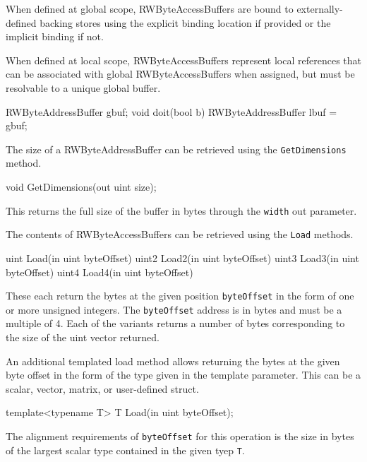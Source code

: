 When defined at global scope, RWByteAccessBuffers are bound to externally-defined backing stores
using the explicit binding location if provided or the implicit binding if not.

When defined at local scope, RWByteAccessBuffers represent local references
that can be associated with global RWByteAccessBuffers when assigned,
but must be resolvable to a unique global buffer.

\begin{HLSL}
  RWByteAddressBuffer gbuf;
  void doit(bool b) {
    RWByteAddressBuffer lbuf = gbuf;
  }
\end{HLSL}


The size of a RWByteAddressBuffer can be retrieved using the \texttt{GetDimensions} method.
\begin{HLSL}
void GetDimensions(out uint size);
\end{HLSL}

This returns the full size of the buffer in bytes through the \texttt{width} out parameter.


The contents of RWByteAccessBuffers can be retrieved using the \texttt{Load} methods.

\begin{HLSL}
 uint Load(in uint byteOffset)
 uint2 Load2(in uint byteOffset)
 uint3 Load3(in uint byteOffset)
 uint4 Load4(in uint byteOffset)
\end{HLSL}

These each return the bytes at the given position \texttt{byteOffset} in the form of one or more unsigned integers.
The \texttt{byteOffset} address is in bytes and must be a multiple of 4.
Each of the variants returns a number of bytes corresponding to the size of the uint vector returned.

An additional templated load method allows returning the bytes at the given byte offset in the form
of the type given in the template parameter. This can be a scalar, vector, matrix, or user-defined struct.

\begin{HLSL}
  template<typename T>
  T Load(in uint byteOffset);
\end{HLSL}

The alignment requirements of \texttt{byteOffset} for this operation is the size in bytes of the largest
scalar type contained in the given tyep \texttt{T}.

